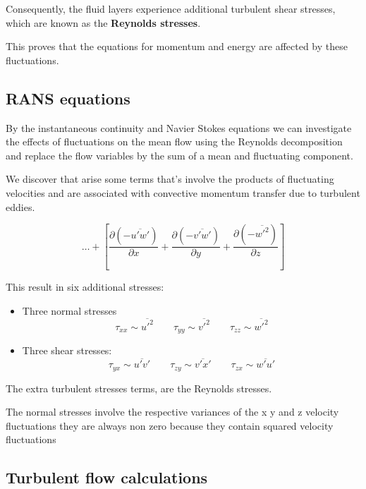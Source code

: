 \documentclass[a4paper, 15pt]{article}
\begin{document}
Consequently,
the fluid layers experience additional turbulent shear stresses, which are known
as the \textbf{Reynolds stresses}.

This proves that the equations for momentum and energy are affected by these fluctuations. 

\newpage
\subsection*{RANS equations}

	By the instantaneous continuity and Navier Stokes equations we can investigate the effects of
	fluctuations on the mean flow using the Reynolds decomposition and replace the flow variables by the sum of a mean and fluctuating component. \newline 
	
	We discover that arise some terms that's involve the products of fluctuating velocities and are associated with convective momentum transfer due to turbulent eddies. 
	
	\[ \dots + \left[\dfrac{\partial(-\overline{u'w'})}{\partial x} + \dfrac{\partial(-\overline{v'w'})}{\partial y} + \dfrac{\partial(-\overline{w'^2})}{\partial z} \right]\] 
	
	This result in six additional stresses:
	\begin{itemize}
		\item Three normal stresses \[\tau_{xx} \sim \overline{u'^2} \qquad \tau_{yy} \sim \overline{v'^2} \qquad \tau_{zz} \sim \overline{w'^2}\]
		\item Three shear stresses: \[\tau_{yx} \sim \overline{u'v'} \qquad \tau_{zy} \sim \overline{v'x'} \qquad \tau_{zx} \sim \overline{w'u'}\]
	\end{itemize} 
	The extra turbulent stresses terms, are the Reynolds stresses. \newline 
	
	The
	normal stresses involve the respective variances of the x y and z velocity fluctuations they
	are always non zero because they contain squared velocity fluctuations

\subsection*{Turbulent flow calculations}
\end{document}
